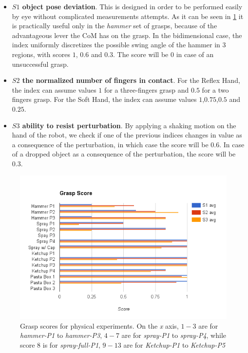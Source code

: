 \begin{itemize}
\item \textbf{$S1$ object pose deviation}. This is designed in order to be performed easily by eye without complicated measurements attempts. As it can be seen in \ref{real_score} it is practically useful only in the \emph{hammer} set of grasps, because of the advantageous lever the CoM has on the grasp. In the bidimensional case, the index uniformly discretizes the possible swing angle of the hammer in $3$ regions, with scores $1$, $0.6$ and $0.3$. The score will be $0$ in case of an unsuccessful grasp.
\item \textbf{$S2$ the normalized number of fingers in contact}. For the Reflex Hand, the index can assume values $1$ for a three-fingers grasp and $0.5$ for a two fingers grasp. For the Soft Hand, the index can assume values $1$,$0.75$,$0.5$ and $0.25$.
\item \textbf{$S3$ ability to resist perturbation}. By applying a shaking motion on the hand of the robot, we check if one of the previous indices changes in value as a consequence of the perturbation, in which case the score will be $0.6$. In case of a dropped object as a consequence of the perturbation, the score will be $0.3$.
\end{itemize}


\begin{figure}[!hbt]
\begin{center}
        \includegraphics[width=0.95\columnwidth]     {images/ssoch/real_score}
        \caption{Grasp scores for physical experiments. On the \emph{x} axis, $1-3$ are for \emph{hammer-P1} to \emph{hammer-P3}, $4-7$ are for \emph{spray-P1} to \emph{spray-P4}, while score $8$ is for \emph{spray-full-P1}, $9-13$ are for \emph{Ketchup-P1} to \emph{Ketchup-P5}}
        \label{real_score}
        \end{center}
\end{figure}

